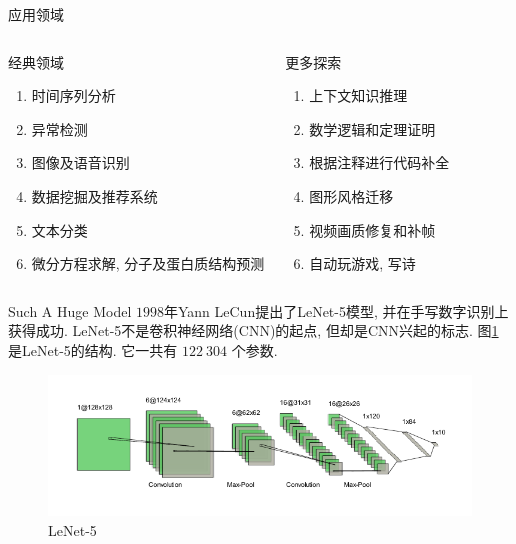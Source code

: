 \documentclass{beamer}
\begin{document}
\begin{frame}{应用领域}
    \footnotesize
    \begin{columns}
        \begin{textbox}{\footnotesize 经典领域}
            \begin{enumerate}
                \item 时间序列分析
                \item 异常检测
                \item 图像及语音识别
                \item 数据挖掘及推荐系统
                \item 文本分类
                \item 微分方程求解, 分子及蛋白质结构预测
            \end{enumerate}
        \end{textbox}

        \begin{textbox}{\footnotesize 更多探索}
            \begin{enumerate}
                \item 上下文知识推理
                \item 数学逻辑和定理证明
                \item 根据注释进行代码补全
                \item 图形风格迁移
                \item 视频画质修复和补帧
                \item 自动玩游戏, 写诗
            \end{enumerate}
        \end{textbox}
        
    \end{columns}
    
\end{frame}

\begin{frame}{Such A Huge Model}
    \footnotesize
    $1998$年Yann LeCun提出了LeNet-5\cite{lenet5nn}模型, 并在手写数字识别上获得成功. LeNet-5不是卷积神经网络(CNN)的起点, 但却是CNN兴起的标志. 图\ref{fig:lenet5}是LeNet-5的结构. 它一共有 $122~304$ 个参数.
    \begin{figure}
        \centering
        \includegraphics[scale=0.8]{./pic/lenet5.pdf}
        \caption{{LeNet-5}}
        \label{fig:lenet5}
    \end{figure}
\end{frame}
\end{document}
